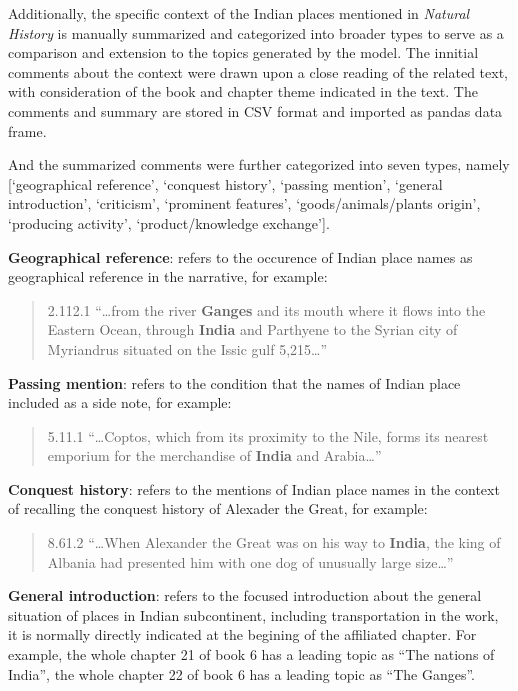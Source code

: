 \documentclass[
  12pt,
]{article}
\begin{document}
Additionally, the specific context of the Indian places mentioned in
\emph{Natural History} is manually summarized and categorized into
broader types to serve as a comparison and extension to the topics
generated by the model. The innitial comments about the context were
drawn upon a close reading of the related text, with consideration of
the book and chapter theme indicated in the text. The comments and
summary are stored in CSV format and imported as pandas data frame.

And the summarized comments were further categorized into seven types,
namely {[}`geographical reference', `conquest history', `passing
mention', `general introduction', `criticism', `prominent features',
`goods/animals/plants origin', `producing activity', `product/knowledge
exchange'{]}.

\textbf{Geographical reference}: refers to the occurence of Indian place
names as geographical reference in the narrative, for example:

\begin{quote}
2.112.1 ``\ldots from the river \textbf{Ganges} and its mouth where it
flows into the Eastern Ocean, through \textbf{India} and Parthyene to
the Syrian city of Myriandrus situated on the Issic gulf 5,215\ldots{}''
\end{quote}

\textbf{Passing mention}: refers to the condition that the names of
Indian place included as a side note, for example:

\begin{quote}
5.11.1 ``\ldots Coptos, which from its proximity to the Nile, forms its
nearest emporium for the merchandise of \textbf{India} and
Arabia\ldots{}''
\end{quote}

\textbf{Conquest history}: refers to the mentions of Indian place names
in the context of recalling the conquest history of Alexader the Great,
for example:

\begin{quote}
8.61.2 ``\ldots When Alexander the Great was on his way to
\textbf{India}, the king of Albania had presented him with one dog of
unusually large size\ldots{}''
\end{quote}

\textbf{General introduction}: refers to the focused introduction about
the general situation of places in Indian subcontinent, including
transportation in the work, it is normally directly indicated at the
begining of the affiliated chapter. For example, the whole chapter 21 of
book 6 has a leading topic as ``The nations of India'', the whole
chapter 22 of book 6 has a leading topic as ``The Ganges''.
\end{document}
